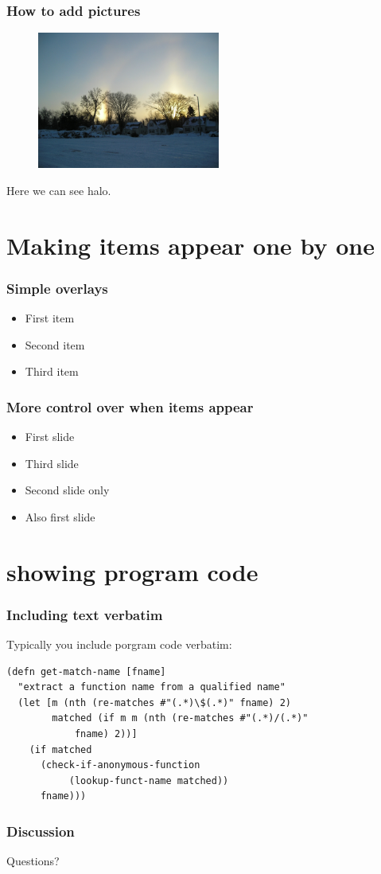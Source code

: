 \documentclass{beamer}
\begin{document}
\begin{frame}
  \frametitle{How to add pictures}
\begin{figure}
\includegraphics[height=45mm]{halo.jpg}
\end{figure}

Here we can see halo. 
\end{frame}

\section{Making items appear one by one}

\begin{frame}
  \frametitle{Simple overlays}
\begin{itemize}
\item First item 
\pause
\item Second item
\pause
\item Third item
\end{itemize}
\end{frame}

\begin{frame}
\frametitle{More control over when items appear}
\begin{itemize}
\item <1-> First slide
\item <3> Third slide
\item <2>Second slide only
\item <1->Also first slide
\end{itemize}
\end{frame}

\section{showing program code}

\begin{frame}[fragile]
\frametitle{Including text verbatim}
Typically you include porgram code verbatim:
\begin{verbatim}
(defn get-match-name [fname]
  "extract a function name from a qualified name"
  (let [m (nth (re-matches #"(.*)\$(.*)" fname) 2)
        matched (if m m (nth (re-matches #"(.*)/(.*)" 
            fname) 2))]
    (if matched
      (check-if-anonymous-function 
           (lookup-funct-name matched))
      fname)))
\end{verbatim}
\end{frame}

\begin{frame}
  \frametitle{Discussion}
Questions?
\end{frame}
\end{document}
